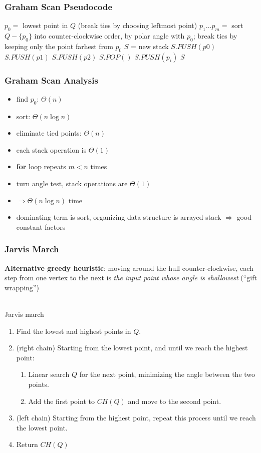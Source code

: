 \documentclass{beamer}
\newcommand{\stanza}{ \\~\ }
\begin{document}
\begin{frame} \frametitle{Graham Scan Pseudocode}
  {\small
\begin{algorithmic}[1]
   
    \State $p_0 = $ lowest point in $Q$ (break ties by choosing leftmost point)
    \State $p_1 \ldots p_m = $ sort $Q-\{p_0\}$ into counter-clockwise order,
      by polar angle with $p_0$; break ties by keeping only the point farhest from $p_0$
    \State $S$ = new stack
    \State $S.PUSH(p0)$
    \State $S.PUSH(p1)$
    \State $S.PUSH(p2)$
        \State $S.POP()$
      \EndWhile
      \State $S.PUSH(p_i)$
    \EndFor
    \State \Return $S$
  \EndFunction
\end{algorithmic}
}
\end{frame}

\begin{frame} \frametitle{Graham Scan Analysis}
\begin{itemize}
  \item find $p_0$: $\Theta(n)$
  \item sort: $\Theta(n \log n)$
  \item eliminate tied points: $\Theta(n)$
  \item each stack operation is $\Theta(1)$
  \item \textbf{for} loop repeats $m < n$ times
  \item turn angle test, stack operations are $\Theta(1)$
  \item $\Rightarrow \Theta(n \log n)$ time
  \item dominating term is sort, organizing data structure is arrayed stack
    $\Rightarrow$ good constant factors
\end{itemize}
\end{frame}

\begin{frame} \frametitle{Jarvis March}
\textbf{Alternative greedy heuristic}: moving around the hull counter-clockwise,
 each step from one vertex to the next is
 \emph{the input point whose angle is shallowest} (``gift wrapping'') \stanza

Jarvis march
\begin{enumerate}
  \item Find the lowest and highest points in $Q$.
  \item (right chain) Starting from the lowest point, and until we reach the highest point:
    \begin{enumerate}
      \item Linear search $Q$ for the next point, minimizing the angle between
        the two points.
      \item Add the first point to $CH(Q)$ and move to the second point.
    \end{enumerate}
  \item (left chain) Starting from the highest point, repeat this process until we
    reach the lowest point.
  \item Return $CH(Q)$
\end{enumerate}
\end{frame}
\end{document}
